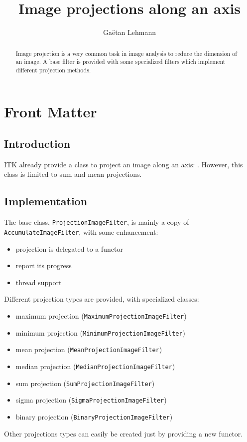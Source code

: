 \documentclass{InsightArticle}
\title{Image projections along an axis}
\author{Ga\"etan Lehmann}
\begin{document}
\maketitle

\ifhtml
\chapter*{Front Matter\label{front}}
\fi


\begin{abstract}
\noindent
Image projection is a very common task in image analysis to reduce the dimension
of an image. A base filter is provided with some specialized filters which
implement different projection methods.
\end{abstract}


\section{Introduction}
ITK already provide a class to project an image along an axis:
. However, this class is limited to sum
and mean projections.


\section{Implementation}

The base class, \verb$ProjectionImageFilter$, is mainly a copy of
\verb$AccumulateImageFilter$, with some enhancement:
\begin{itemize}
  \item projection is delegated to a functor
  \item report its progress
  \item thread support
\end{itemize}
Different projection types are provided, with specialized classes:
\begin{itemize}
  \item maximum projection (\verb$MaximumProjectionImageFilter$)
  \item minimum projection (\verb$MinimumProjectionImageFilter$)
  \item mean projection (\verb$MeanProjectionImageFilter$)
  \item median projection (\verb$MedianProjectionImageFilter$)
  \item sum projection (\verb$SumProjectionImageFilter$)
  \item sigma projection (\verb$SigmaProjectionImageFilter$)
  \item binary projection (\verb$BinaryProjectionImageFilter$)
\end{itemize}
Other projections types can easily be created just by providing a new functor.
\end{document}
